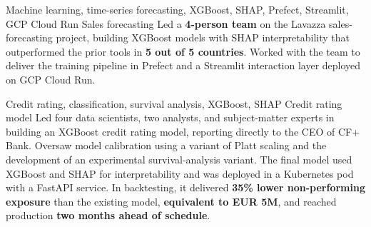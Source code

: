 \documentclass[10pt,a4paper]{awesome-cv}
\renewenvironment{cvitems}{%
  \vspace{-3.2mm}
  \begin{itemize}[leftmargin=2ex,nosep,noitemsep]
    \setlength{\parskip}{0pt}
    \renewcommand{\labelitemi}{\bullet}
    \RaggedRight
}{%
  \end{itemize}
  \vspace{2mm}
}
\begin{document}
\begin{cventries}
  \cventry
    {Machine learning, time-series forecasting, XGBoost, SHAP, Prefect, Streamlit, GCP Cloud Run}
    {Sales forecasting}
    {}
    {}
    {Led a \textbf{4-person team} on the Lavazza sales-forecasting project, building XGBoost models with SHAP interpretability that outperformed the prior tools in \textbf{5 out of 5 countries}. Worked with the team to deliver the training pipeline in Prefect and a Streamlit interaction layer deployed on GCP Cloud Run.\vspace{4mm}}

  \cventry
    {Credit rating, classification, survival analysis, XGBoost, SHAP}
    {Credit rating model}
    {}
    {}
    {Led four data scientists, two analysts, and subject-matter experts in building an XGBoost credit rating model, reporting directly to the CEO of CF+ Bank. Oversaw model calibration using a variant of Platt scaling and the development of an experimental survival-analysis variant. The final model used XGBoost and SHAP for interpretability and was deployed in a Kubernetes pod with a FastAPI service. In backtesting, it delivered \textbf{35\% lower non-performing exposure} than the existing model, \textbf{equivalent to EUR 5M}, and reached production \textbf{two months ahead of schedule}.\vspace{4mm}}
\end{cventries}

\newpage
\vspace*{4mm}

\end{document}
